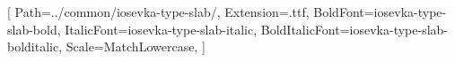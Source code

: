 \usepackage{amssymb,amsmath}
\usepackage{fontspec}
\usepackage{fourier}
\setmonofont{iosevka-type-slab-regular}[
  Path=../common/iosevka-type-slab/,
  Extension=.ttf,
  BoldFont=iosevka-type-slab-bold,
  ItalicFont=iosevka-type-slab-italic,
  BoldItalicFont=iosevka-type-slab-bolditalic,
  Scale=MatchLowercase,
]
